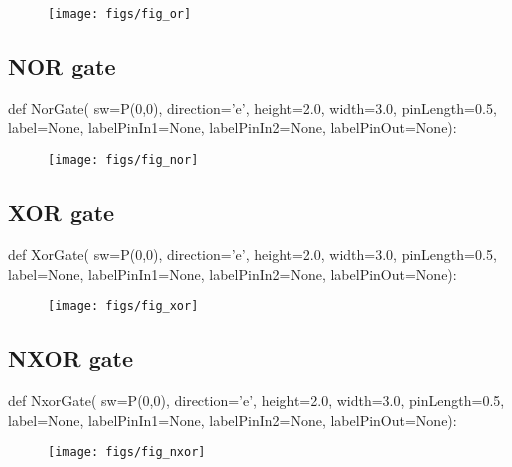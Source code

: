 \begin{figure}[!h]
\centerline{\texttt{[image: figs/fig\_or]}}
\end{figure}

\subsection{NOR gate}
\label{func:electronicsNor}
\begin{python}
def NorGate(
        sw=P(0,0),
        direction='e',
        height=2.0,
        width=3.0,
        pinLength=0.5,
        label=None,
        labelPinIn1=None,
        labelPinIn2=None,
        labelPinOut=None):
\end{python}

\begin{figure}[!h]
\centerline{\texttt{[image: figs/fig\_nor]}}
\end{figure}

\subsection{XOR gate}
\label{func:electronicsXor}
\begin{python}
def XorGate(
        sw=P(0,0),
        direction='e',
        height=2.0,
        width=3.0,
        pinLength=0.5,
        label=None,
        labelPinIn1=None,
        labelPinIn2=None,
        labelPinOut=None):
\end{python}

\begin{figure}[!h]
\centerline{\texttt{[image: figs/fig\_xor]}}
\end{figure}

\subsection{NXOR gate}
\label{func:electronicsNxor}
\begin{python}
def NxorGate(
        sw=P(0,0),
        direction='e',
        height=2.0,
        width=3.0,
        pinLength=0.5,
        label=None,
        labelPinIn1=None,
        labelPinIn2=None,
        labelPinOut=None):
\end{python}

\begin{figure}[!h]
\centerline{\texttt{[image: figs/fig\_nxor]}}
\end{figure}

